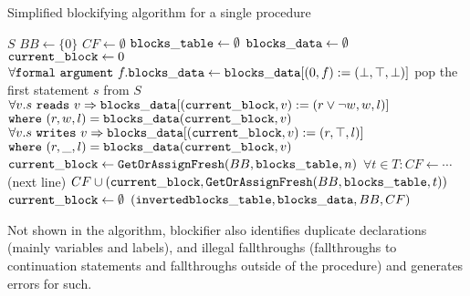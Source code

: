 \begin{algorithm}
    \caption{Simplified blockifying algorithm for a single procedure}
    \label{alg:blockifying}
    \begin{algorithmic}
        \Require $S$ 
        \State $BB \gets \{0\}$ 
        \State $CF \gets \emptyset$ 
        \State $\mathtt{blocks\_table} \gets \emptyset$ 
        \State $\mathtt{blocks\_data} \gets \emptyset$ 
        \State $\mathtt{current\_block} \gets 0$ 
        \State $\forall \mathtt{formal\ argument}\ f . \mathtt{blocks\_data} \gets \mathtt{blocks\_data} [ (0, f) := (\bot, \top, \bot) ]$
            \State pop the first statement $s$ from $S$
                \State {}
                \State $\forall v . s\ \mathtt{reads}\ v \Rightarrow \mathtt{blocks\_data} [ (\mathtt{current\_block}, v) := (r \lor \neg w, w, l) ]$
                \State \quad\quad $\mathtt{where}\ (r, w, l) = \mathtt{blocks\_data}(\mathtt{current\_block}, v)$
                \State $\forall v . s\ \mathtt{writes}\ v \Rightarrow \mathtt{blocks\_data} [ (\mathtt{current\_block}, v) := (r, \top, l) ]$
                \State \quad\quad $\mathtt{where}\ (r, \_, l) = \mathtt{blocks\_data}(\mathtt{current\_block}, v)$
                \State {}
            \EndIf
                \State $\mathtt{current\_block} \gets \mathtt{GetOrAssignFresh}(BB, \mathtt{blocks\_table},n)$
                \State $\forall t \in T: CF \gets \cdots$  (next line)
                \State $CF \cup (\mathtt{current\_block}, \mathtt{GetOrAssignFresh}(BB, \mathtt{blocks\_table},t))$
                \State $\mathtt{current\_block} \gets \emptyset$
            \EndIf
            \State \Return $(\mathtt{inverted } \mathtt{blocks\_table}, \mathtt{blocks\_data}, BB, CF)$
        \EndWhile
    \end{algorithmic}
\end{algorithm}

Not shown in the algorithm, blockifier also identifies duplicate declarations (mainly variables and labels), and illegal fallthroughs (fallthroughs to continuation statements and fallthroughs outside of the procedure) and generates errors for such.

